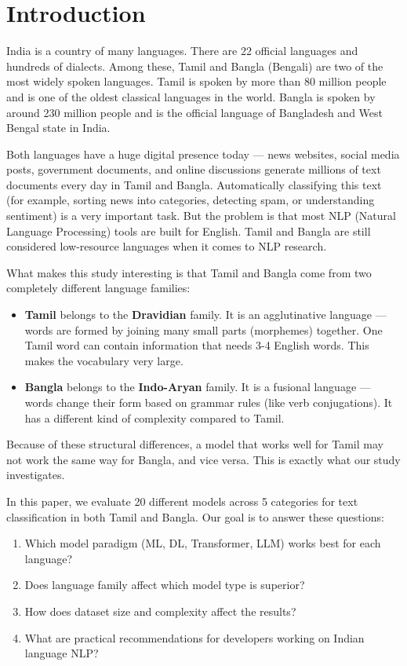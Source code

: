 \documentclass[conference]{IEEEtran}
\begin{document}
\section{Introduction}

India is a country of many languages. There are 22 official languages and hundreds of dialects. Among these, Tamil and Bangla (Bengali) are two of the most widely spoken languages. Tamil is spoken by more than 80 million people and is one of the oldest classical languages in the world. Bangla is spoken by around 230 million people and is the official language of Bangladesh and West Bengal state in India.

Both languages have a huge digital presence today --- news websites, social media posts, government documents, and online discussions generate millions of text documents every day in Tamil and Bangla. Automatically classifying this text (for example, sorting news into categories, detecting spam, or understanding sentiment) is a very important task. But the problem is that most NLP (Natural Language Processing) tools are built for English. Tamil and Bangla are still considered low-resource languages when it comes to NLP research.

What makes this study interesting is that Tamil and Bangla come from two completely different language families:

\begin{itemize}
\item \textbf{Tamil} belongs to the \textbf{Dravidian} family. It is an agglutinative language --- words are formed by joining many small parts (morphemes) together. One Tamil word can contain information that needs 3-4 English words. This makes the vocabulary very large.
\item \textbf{Bangla} belongs to the \textbf{Indo-Aryan} family. It is a fusional language --- words change their form based on grammar rules (like verb conjugations). It has a different kind of complexity compared to Tamil.
\end{itemize}

Because of these structural differences, a model that works well for Tamil may not work the same way for Bangla, and vice versa. This is exactly what our study investigates.

In this paper, we evaluate 20 different models across 5 categories for text classification in both Tamil and Bangla. Our goal is to answer these questions:
\begin{enumerate}
\item Which model paradigm (ML, DL, Transformer, LLM) works best for each language?
\item Does language family affect which model type is superior?
\item How does dataset size and complexity affect the results?
\item What are practical recommendations for developers working on Indian language NLP?
\end{enumerate}
\end{document}
